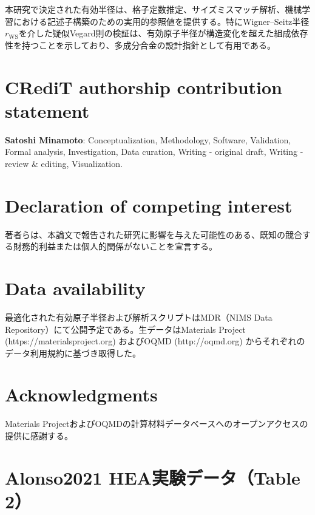 \documentclass[a4paper,10pt,5p]{elsarticle}
\begin{document}
本研究で決定された有効半径は、格子定数推定、サイズミスマッチ解析、機械学習における記述子構築のための実用的参照値を提供する。特にWigner--Seitz半径$r_\mathrm{WS}$を介した疑似Vegard則の検証は、有効原子半径が構造変化を超えた組成依存性を持つことを示しており、多成分合金の設計指針として有用である。


\section*{CRediT authorship contribution statement}

\textbf{Satoshi Minamoto}: Conceptualization, Methodology, Software, Validation, Formal analysis, Investigation, Data curation, Writing - original draft, Writing - review \& editing, Visualization.


\section*{Declaration of competing interest}

著者らは、本論文で報告された研究に影響を与えた可能性のある、既知の競合する財務的利益または個人的関係がないことを宣言する。


\section*{Data availability}

最適化された有効原子半径および解析スクリプトはMDR（NIMS Data Repository）にて公開予定である。生データはMaterials Project (https://materialsproject.org) およびOQMD (http://oqmd.org) からそれぞれのデータ利用規約に基づき取得した。


\section*{Acknowledgments}

Materials ProjectおよびOQMDの計算材料データベースへのオープンアクセスの提供に感謝する。






\appendix

\section{Alonso2021 HEA実験データ（Table 2）}
\label{appendix:alonso}
\end{document}
